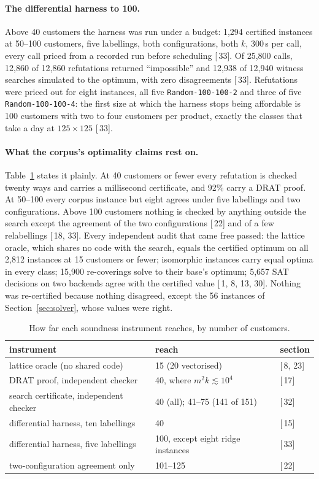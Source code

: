 \documentclass[11pt,a4paper]{article}
\renewcommand{\S}[1]{[\textsection\,#1]}
\newcommand{\code}[1]{\texttt{#1}}
\begin{document}
\paragraph{The differential harness to 100.}
Above 40 customers the harness was run under a budget: 1,294 certified
instances at 50--100 customers, five labellings, both configurations, both
$k$, 300\,s per call, every call priced from a recorded run before scheduling
\S{33}. Of 25,800 calls, 12,860 of 12,860 refutations returned ``impossible''
and 12,938 of 12,940 witness searches simulated to the optimum, with zero
disagreements \S{33}. Refutations were priced out for eight instances, all
five \code{Random-100-100-2} and three of five \code{Random-100-100-4}: the
first size at which the harness stops being affordable is 100 customers with
two to four customers per product, exactly the classes that take a day at
$125 \times 125$ \S{33}.

\paragraph{What the corpus's optimality claims rest on.}
Table~\ref{tab:reach} states it plainly. At 40 customers or fewer every
refutation is checked twenty ways and carries a millisecond certificate, and
92\% carry a DRAT proof. At 50--100 every corpus instance but eight agrees
under five labellings and two configurations. Above 100 customers nothing is
checked by anything outside the search except the agreement of the two
configurations \S{22} and of a few relabellings \S{18, 33}. Every independent
audit that came free passed: the lattice oracle, which shares no code with the
search, equals the certified optimum on all 2,812 instances at 15 customers or
fewer; isomorphic instances carry equal optima in every class; 15,900
re-coverings solve to their base's optimum; 5,657 SAT decisions on two
backends agree with the certified value \S{1, 8, 13, 30}. Nothing was
re-certified because nothing disagreed, except the 56 instances of
Section~\ref{sec:solver}, whose values were right.

\begin{table}[t]
\centering
\small
\caption{How far each soundness instrument reaches, by number of customers.}
\label{tab:reach}
\begin{tabular}{lll}
\toprule
instrument & reach & section \\
\midrule
lattice oracle (no shared code) & 15 (20 vectorised) & \S{8, 23} \\
DRAT proof, independent checker & 40, where $m^2 k \lesssim 10^4$ & \S{17} \\
search certificate, independent checker & 40 (all); 41--75 (141 of 151) & \S{32} \\
differential harness, ten labellings & 40 & \S{15} \\
differential harness, five labellings & 100, except eight ridge instances & \S{33} \\
two-configuration agreement only & 101--125 & \S{22} \\
\bottomrule
\end{tabular}
\end{table}
\end{document}
